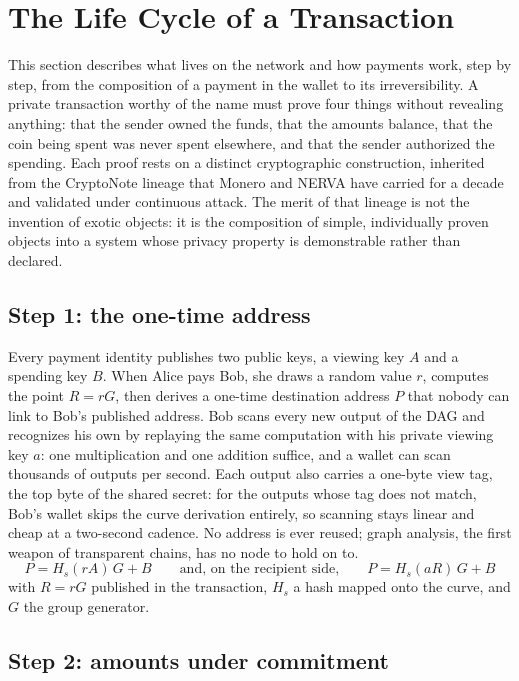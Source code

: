 
\section{The Life Cycle of a Transaction}\label{sec:tx}

This section describes what lives on the network and how payments work,
step by step, from the composition of a payment in the wallet to its
irreversibility. A private transaction worthy of the name must prove four
things without revealing anything: that the sender owned the funds, that
the amounts balance, that the coin being spent was never spent elsewhere,
and that the sender authorized the spending. Each proof rests on a
distinct cryptographic construction, inherited from the CryptoNote lineage
that Monero and NERVA have carried for a decade and validated under
continuous attack. The merit of that lineage is not the invention of
exotic objects: it is the composition of simple, individually proven
objects into a system whose privacy property is demonstrable rather than
declared.

\subsection{Step 1: the one-time address}

Every payment identity publishes two public keys, a viewing key $A$ and a
spending key $B$. When Alice pays Bob, she draws a random value $r$,
computes the point $R = rG$, then derives a one-time destination address
$P$ that nobody can link to Bob's published address. Bob scans every new
output of the DAG and recognizes his own by replaying the same computation
with his private viewing key $a$: one multiplication and one addition
suffice, and a wallet can scan thousands of outputs per second. Each
output also carries a one-byte view tag, the top byte of the shared
secret: for the outputs whose tag does not match, Bob's wallet skips the
curve derivation entirely, so scanning stays linear and cheap at a
two-second cadence. No address is ever reused; graph analysis, the first
weapon of transparent chains, has no node to hold on to.
\begin{equation}\label{eq:onetim}
P = H_s(rA)\,G + B
\qquad\text{and, on the recipient side,}\qquad
P = H_s(aR)\,G + B
\end{equation}
with $R = rG$ published in the transaction, $H_s$ a hash mapped onto the
curve, and $G$ the group generator.

\subsection{Step 2: amounts under commitment}

